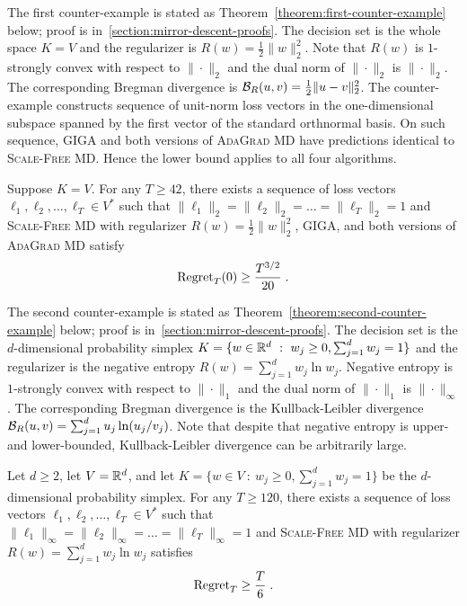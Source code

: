 The first counter-example is stated as
Theorem~\ref{theorem:first-counter-example} below; proof is
in~\ref{section:mirror-descent-proofs}. The decision set is the whole space
$K=V$ and the regularizer is $R(w) = \frac{1}{2}\|w\|_2^2$. Note that $R(w)$ is
$1$-strongly convex with respect to $\|\cdot\|_2$ and the dual norm of
$\|\cdot\|_2$ is $\|\cdot\|_2$. The corresponding Bregman divergence is
$\mathcal{B}_R(u,v) = \frac{1}{2}\|u-v\|_2^2$. The counter-example constructs
sequence of unit-norm loss vectors in the one-dimensional subspace spanned by
the first vector of the standard orthnormal basis.  On such sequence,
\textsc{GIGA} and both versions of \textsc{AdaGrad MD} have predictions
identical to \textsc{Scale-Free MD}. Hence the lower bound applies to all four
algorithms.

\begin{theorem}
\label{theorem:first-counter-example}
Suppose $K = V$. For any $T \ge 42$, there exists a sequence of loss vectors
$\ell_1, \ell_2, \dots, \ell_T \in V^*$ such that $\|\ell_1\|_2 = \|\ell_2\|_2
= \dots = \|\ell_T\|_2 = 1$ and \textsc{Scale-Free MD} with
regularizer $R(w) = \frac{1}{2}\|w\|_2^2$, \textsc{GIGA},
and both versions of \textsc{AdaGrad MD} satisfy
$$
\operatorname{Regret}_T(0) \ge \frac{T^{3/2}}{20} \; .
$$
\end{theorem}

The second counter-example is stated as
Theorem~\ref{theorem:second-counter-example} below; proof is
in~\ref{section:mirror-descent-proofs}.  The decision set is the
$d$-dimensional probability simplex $K = \{ w \in \mathbb{R}^d ~:~ w_j \ge 0,
\sum_{j=1}^d w_j = 1 \}$ and the regularizer is the negative entropy $R(w) =
\sum_{j=1}^d w_j \ln w_j$.  Negative entropy is $1$-strongly convex with
respect to $\|\cdot\|_1$ and the dual norm of $\|\cdot\|_1$ is
\mbox{$\|\cdot\|_\infty$}.  The corresponding Bregman divergence is the
Kullback-Leibler divergence $\mathcal{B}_R(u,v) = \sum_{j=1}^d u_j \ln(u_j/v_j)$.
Note that despite that negative entropy is upper- and lower-bounded,
Kullback-Leibler divergence can be arbitrarily large.

\begin{theorem}
\label{theorem:second-counter-example}
Let $d \ge 2$, let $V = \mathbb{R}^d$, and let $K = \{ w \in V ~:~ w_j \ge 0,
\sum_{j=1}^d w_j = 1 \}$ be the $d$-dimensional probability simplex.  For any
$T \ge 120$, there exists a sequence of loss vectors $\ell_1, \ell_2, \dots,
\ell_T \in V^*$ such that $\|\ell_1\|_\infty = \|\ell_2\|_\infty = \dots =
\|\ell_T\|_\infty = 1$ and \textsc{Scale-Free MD} with regularizer
$R(w) = \sum_{j=1}^d w_j \ln w_j$ satisfies
$$
\operatorname{Regret}_T \ge \frac{T}{6} \; .
$$
\end{theorem}
